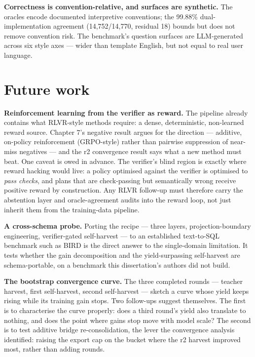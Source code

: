\documentclass[10pt]{article} %
\begin{document}
\textbf{Correctness is convention-relative, and surfaces are synthetic.} The oracles encode documented interpretive conventions; the 99.88\% dual-implementation agreement (14,752/14,770, residual 18) bounds but does not remove convention risk. The benchmark's question surfaces are LLM-generated across six style axes --- wider than template English, but not equal to real user language.

\section{Future work}\label{sec:future-work}

\textbf{Reinforcement learning from the verifier as reward.} The pipeline already contains what RLVR-style methods require: a dense, deterministic, non-learned reward source. Chapter 7's negative result argues for the direction --- additive, on-policy reinforcement (GRPO-style) rather than pairwise suppression of near-miss negatives --- and the r2 convergence result says what a new method must beat. One caveat is owed in advance. The verifier's blind region is exactly where reward hacking would live: a policy optimised against the verifier is optimised to \emph{pass checks}, and plans that are check-passing but semantically wrong receive positive reward by construction. Any RLVR follow-up must therefore carry the abstention layer and oracle-agreement audits into the reward loop, not just inherit them from the training-data pipeline.

\textbf{A cross-schema probe.} Porting the recipe --- three layers, projection-boundary engineering, verifier-gated self-harvest --- to an established text-to-SQL benchmark such as BIRD is the direct answer to the single-domain limitation. It tests whether the gain decomposition and the yield-surpassing self-harvest are schema-portable, on a benchmark this dissertation's authors did not build.

\textbf{The bootstrap convergence curve.} The three completed rounds --- teacher harvest, first self-harvest, second self-harvest --- sketch a curve whose yield keeps rising while its training gain stops. Two follow-ups suggest themselves. The first is to characterise the curve properly: does a third round's yield also translate to nothing, and does the point where gains stop move with model scale? The second is to test additive bridge re-consolidation, the lever the convergence analysis identified: raising the export cap on the bucket where the r2 harvest improved most, rather than adding rounds.
\end{document}

